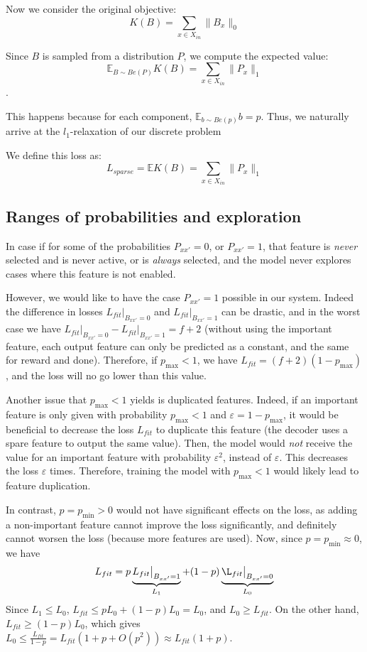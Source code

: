 \documentclass[a4paper,11pt,oneside]{report}
\begin{document}
Now we consider the original objective:
$$
K(B)=\sum\limits_{x\in X_{in}}\|B_x\|_0
$$

Since $B$ is sampled from a distribution $P$, we compute the expected value:
$$
\mathbb E_{B\sim Be(P)}K(B)=\sum\limits_{x\in X_{in}}\|P_x\|_1
$$.

This happens because for each component, $\mathbb E_{b\sim Be(p)}b=p$. Thus, we naturally arrive at the $l_1$-relaxation of our discrete problem \cite{Bengio2013}

We define this loss as:
$$
L_{sparse}=\mathbb E K(B)=\sum\limits_{x\in X_{in}}\|P_x\|_1
$$

\subsection{Ranges of probabilities and exploration}
\label{subsec:proba_ranges}
In case if for some of the probabilities $P_{xx'}=0$, or $P_{xx'}=1$, that feature is {\em never} selected and is never active, or is {\em always} selected, and the model never explores cases where this feature is not enabled.

However, we would like to have the case $P_{xx'}=1$ possible in our system. Indeed the difference in losses $L_{fit}\big|_{B_{xx'}=0}$ and $L_{fit}\big|_{B_{xx'}=1}$ can be drastic, and in the worst case we have $L_{fit}\big|_{B_{xx'}=0}-L_{fit}\big|_{B_{xx'}=1}=f+2$ (without using the important feature, each output feature can only be predicted as a constant, and the same for reward and done). Therefore, if $p_{\max}<1$, we have $L_{fit}=(f+2)(1-p_{\max})$, and the loss will no go lower than this value.

Another issue that $p_{\max}<1$ yields is duplicated features. Indeed, if an important feature is only given with probability $p_{\max}<1$ and $\varepsilon=1-p_{\max}$, it would be beneficial to decrease the loss $L_{fit}$ to duplicate this feature (the decoder uses a spare feature to output the same value). Then, the model would {\em not} receive the value for an important feature with probability $\varepsilon^2$, instead of $\varepsilon$. This decreases the loss $\varepsilon$ times. Therefore, training the model with $p_{\max}<1$ would likely lead to feature duplication.

In contrast, $p=p_{\min}>0$ would not have significant effects on the loss, as adding a non-important feature cannot improve the loss significantly, and definitely cannot worsen the loss (because more features are used). Now, since $p=p_{\min}\approx 0$, we have
$$
L_{fit}=p\underbrace{L_{fit}\big|_{B_{xx'}=1}}_{L_1}+(1-p)\underbrace{\L_{fit}\big|_{B_{xx'}=0}}_{L_0}
$$
Since $L_1\leq L_0$, $L_{fit}\leq pL_0+(1-p)L_0=L_0$, and $L_0\geq L_{fit}$. On the other hand, $L_{fit}\geq (1-p)L_0$, which gives $L_0\leq \frac{L_{fit}}{1-p}= L_{fit}(1+p+O(p^2))\approx L_{fit}(1+p)$.
\end{document}
